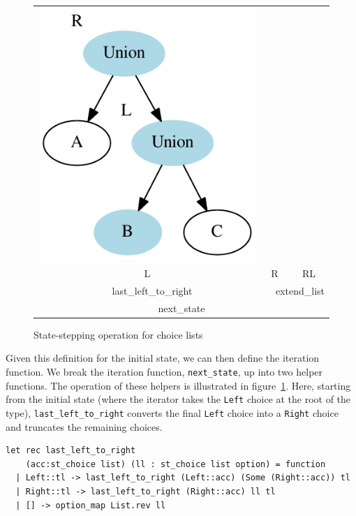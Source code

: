 \documentclass[a4paper,english]{lipics-v2019}
\begin{document}
\begin{figure}
\begin{tabular}{cccc}
\includegraphics[scale=0.6]{figures-gen/example3.pdf} \\
L & \multicolumn{2}{c}{R} & RL \\
\multicolumn{2}{c}{last\_left\_to\_right} & \multicolumn{2}{c}{extend\_list} \\
\hline
\multicolumn{4}{c}{next\_state} \\
\end{tabular}
\caption{State-stepping operation for choice lists}
\label{fig:sstep}
\end{figure}

Given this definition for the initial state, we can then define the
iteration function. We break the iteration function,
\verb|next_state|, up into two helper functions. The operation of these
helpers is illustrated in figure~\ref{fig:sstep}. Here, starting from
the initial state (where the iterator takes the \verb+Left+ choice at the
root of the type), \verb|last_left_to_right| converts the final \verb+Left+ choice
into a \verb+Right+ choice and truncates the remaining choices.
\begin{small}
\begin{verbatim}
let rec last_left_to_right 
    (acc:st_choice list) (ll : st_choice list option) = function
  | Left::tl -> last_left_to_right (Left::acc) (Some (Right::acc)) tl
  | Right::tl -> last_left_to_right (Right::acc) ll tl
  | [] -> option_map List.rev ll
\end{verbatim}
\end{small}
\end{document}
